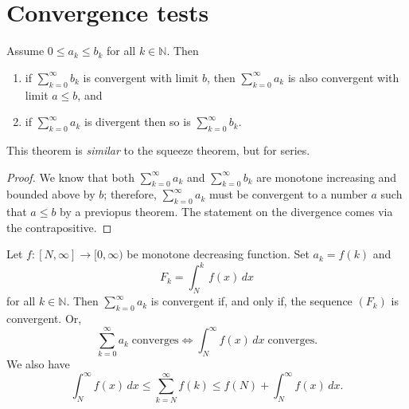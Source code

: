 \section{Convergence tests}

\begin{theorem}
    Assume $0 \leq a_k \leq b_k$ for all $k \in \mathbb N$. Then \begin{enumerate}
        \item if $\sum_{k = 0}^\infty b_k$ is convergent with limit $b$, then $\sum_{k = 0}^\infty a_k$ is also convergent with limit $a \leq b$, and
        \item if $\sum_{k = 0}^\infty a_k$ is divergent then so is $\sum_{k = 0}^\infty b_k$.
    \end{enumerate}
    This theorem is \emph{similar} to the squeeze theorem, but for series.
\end{theorem}

\begin{proof}
    We know that both $\sum_{k = 0}^\infty a_k$ and $\sum_{k = 0}^\infty b_k$ are monotone increasing and bounded above by $b$; therefore, $\sum_{k = 0}^\infty a_k$ must be convergent to a number $a$ such that $a \leq b$ by a previopus theorem. The statement on the divergence comes via the contrapositive.
\end{proof}

\begin{theorem}
    Let $f : [N, \infty] \to [0, \infty)$ be monotone decreasing function. Set $a_k = f(k)$ and \[ F_k = \int_N^k f(x) \, dx \] for all $k \in \mathbb N$. Then $\sum_{k = 0}^\infty a_k$ is convergent if, and only if, the sequence $(F_k)$ is convergent. Or, \[ \sum_{k = 0}^\infty a_k \; \text{converges} \iff \int_N^\infty f(x) \, dx \; \text{converges}. \] We also have \[ \int_N^\infty f(x) \, dx \leq \sum_{k = N}^\infty f(k) \leq f(N) + \int_N^\infty f(x) \, dx. \]
\end{theorem}
